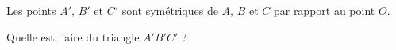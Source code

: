 
    \begin{mental}
        Les points \( A'\), \( B'\) et \( C'\) sont symétriques de \( A\), \( B\) et \( C\) par rapport au point \( O\). 
        \begin{center}
            \large
            
        \end{center}
        Quelle est l'aire du triangle \( A'B'C'\) ?
    \end{mental}
